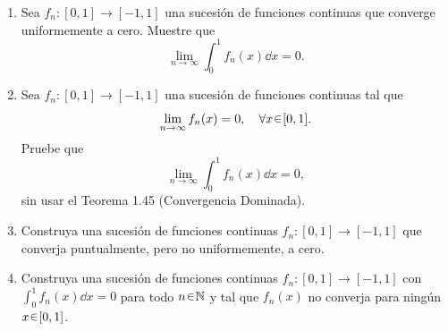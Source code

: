 \setcounter{neje}{58}
\begin{nejer}[Opcional]
\begin{enumerate}[label = (\roman*)]
\item Sea $f_n \colon [0,1] \to [-1, 1]$ una sucesión de funciones continuas que converge uniformemente a cero. Muestre que
$$
\lim_{n \to \infty} \int_0^1 f_n(x) \dd{x} = 0.
$$

\item Sea $f_n \colon [0,1] \to [-1, 1]$ una sucesión de funciones continuas tal que
$$
\lim_{n \to \infty} f_n(x) = 0, \quad \forall x \en [0,1].
$$
Pruebe que
$$
\lim_{n \to \infty} \int_0^1 f_n(x) \dd{x} = 0,
$$
sin usar el Teorema 1.45 (Convergencia Dominada).

\item Construya una sucesión de funciones continuas $f_n \colon [0,1] \to [-1, 1]$ que converja puntualmente, pero no uniformemente, a cero.

\item Construya una sucesión de funciones continuas $f_n \colon [0,1] \to [-1, 1]$ con $\int_0^1 f_n(x) \dd{x} = 0$ para todo $n\en\mathbb{N}$ y tal que $f_n(x)$ no converja para ningún $x \en [0,1]$.
\end{enumerate}
\end{nejer}
